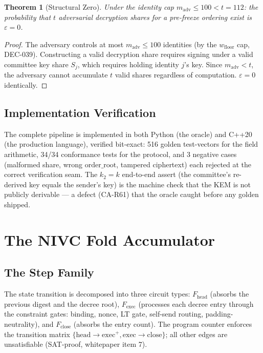 \documentclass[11pt,a4paper]{article}
\newtheorem{theorem}{Theorem}
\begin{document}
\begin{theorem}[Structural Zero]
Under the identity cap $m_{\text{adv}} \le 100 < t = 112$: the
probability that $t$ adversarial decryption shares for a pre-freeze
ordering exist is $\varepsilon = 0$.
\end{theorem}
\begin{proof}
The adversary controls at most $m_{\text{adv}} \le 100$ identities
(by the $w_{\text{floor}}$ cap, DEC-039). Constructing a valid
decryption share requires signing under a valid committee key share
 $S_j$, which requires holding identity $j$'s key. Since $m_{\text{adv}} < t$,
the adversary cannot accumulate $t$ valid shares regardless of
computation. $\varepsilon = 0$ identically.
\end{proof}

\subsection{Implementation Verification}

The complete pipeline is implemented in both Python (the oracle) and
C++20 (the production language), verified bit-exact: 516 golden
test-vectors for the field arithmetic, 34/34 conformance tests for
the protocol, and 3 negative cases (malformed share, wrong
 $\text{order\_root}$, tampered ciphertext) each rejected at the
correct verification seam. The $k_2 = k$ end-to-end assert (the
committee's re-derived key equals the sender's key) is the machine
check that the KEM is not publicly derivable --- a defect
(CA-R61) that the oracle caught before any golden shipped.

\section{The NIVC Fold Accumulator}

\subsection{The Step Family}

The state transition is decomposed into three circuit types:
 $F_{\text{head}}$ (absorbs the previous digest and the decree root),
 $F_{\text{exec}}$ (processes each decree entry through the constraint
gates: binding, nonce, LT gate, self-send routing, padding-neutrality),
and $F_{\text{close}}$ (absorbs the entry count). The program counter
enforces the transition matrix
 $\{\text{head} \to \text{exec}^+, \text{exec} \to \text{close}\}$;
all other edges are unsatisfiable (SAT-proof, whitepaper item 7).
\end{document}

